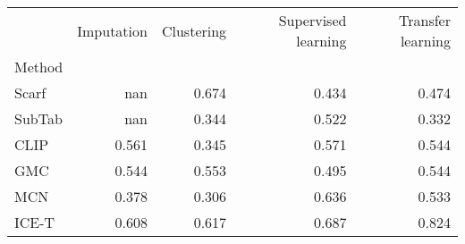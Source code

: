 \begin{tabular}{lrrrr}
\toprule
 & Imputation & Clustering & Supervised learning & Transfer learning \\
Method &  &  &  &  \\
\midrule
Scarf & nan & 0.674 & 0.434 & 0.474 \\
SubTab & nan & 0.344 & 0.522 & 0.332 \\
CLIP & 0.561 & 0.345 & 0.571 & 0.544 \\
GMC & 0.544 & 0.553 & 0.495 & 0.544 \\
MCN & 0.378 & 0.306 & 0.636 & 0.533 \\
ICE-T & 0.608 & 0.617 & 0.687 & 0.824 \\
\bottomrule
\end{tabular}
